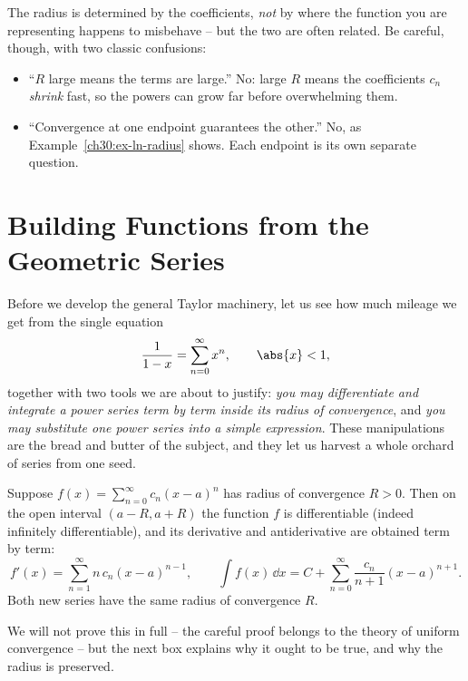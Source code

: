 \begin{trapbox}
The radius is determined by the coefficients, \emph{not} by where the function you are representing happens to misbehave -- but the two are often related. Be careful, though, with two classic confusions:
\begin{itemize}
  \item ``$R$ large means the terms are large.'' No: large $R$ means the coefficients $c_n$ \emph{shrink} fast, so the powers can grow far before overwhelming them.
  \item ``Convergence at one endpoint guarantees the other.'' No, as Example~\ref{ch30:ex-ln-radius} shows. Each endpoint is its own separate question.
\end{itemize}
\end{trapbox}

\section{Building Functions from the Geometric Series}
\label{ch30:sec-building}

Before we develop the general Taylor machinery, let us see how much mileage we get from the single equation
\[
  \frac{1}{1-x} = \sum_{n=0}^{\infty} x^n, \qquad \abs{x} < 1,
\]
together with two tools we are about to justify: \emph{you may differentiate and integrate a power series term by term inside its radius of convergence}, and \emph{you may substitute one power series into a simple expression}. These manipulations are the bread and butter of the subject, and they let us harvest a whole orchard of series from one seed.

\begin{theorem}
\label{ch30:thm-termwise}
Suppose $f(x) = \sum_{n=0}^{\infty} c_n (x-a)^n$ has radius of convergence $R > 0$. Then on the open interval $(a-R, a+R)$ the function $f$ is differentiable (indeed infinitely differentiable), and its derivative and antiderivative are obtained term by term:
\[
  f'(x) = \sum_{n=1}^{\infty} n\, c_n (x-a)^{n-1},
  \qquad
  \int f(x)\,\dd x = C + \sum_{n=0}^{\infty} \frac{c_n}{n+1}(x-a)^{n+1}.
\]
Both new series have the same radius of convergence $R$.
\end{theorem}

We will not prove this in full -- the careful proof belongs to the theory of uniform convergence -- but the next box explains why it ought to be true, and why the radius is preserved.

